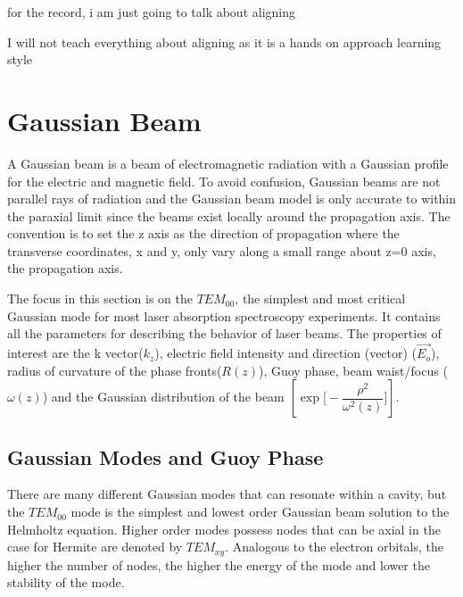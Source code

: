 \documentclass[11pt,a4paper]{book}
\begin{document}
	for the record, i am just going to talk about aligning
	
	I will not teach everything about aligning as it is a hands on approach learning style
	

	\section{Gaussian Beam}
		\label{sec:Gaussian Beam}
		A Gaussian beam is a beam of electromagnetic radiation with a Gaussian profile for the electric and magnetic field. 
		To avoid confusion, Gaussian beams are not parallel rays of radiation and the Gaussian beam model is only accurate to within the paraxial limit since the beams exist locally around the propagation axis.
		The convention is to set the z axis as the direction of propagation where the transverse coordinates, x and y, only vary along a small range about z=0 axis, the propagation axis.
		
		The focus in this section is on the $TEM_{00}$, the simplest and most critical Gaussian mode for most laser absorption spectroscopy experiments. It contains all the parameters for describing the behavior of laser beams. The properties of interest are the k vector($k_z$), electric field intensity and direction (vector) ($\vec{E_o}$), radius of curvature of the phase fronts($R(z)$), Guoy phase, beam waist/focus ($\omega(z)$) and the Gaussian distribution of the beam $\left[ \exp{\bigg[-\dfrac{\rho^2}{\omega^2(z)}\bigg]}\right]$.
		\subsection{Gaussian Modes and Guoy Phase}
			\label{subsec:Gaussian Modes and Guoy Phase}
			
			
			There are many different Gaussian modes that can resonate within a cavity, but the $TEM_{00}$ mode is the simplest and lowest order Gaussian beam solution to the Helmholtz equation. 
			Higher order modes possess nodes that can be axial in the case for Hermite are denoted by $TEM_{xy}$. Analogous to the electron orbitals, the higher the number of nodes, the higher the energy of the mode and lower the stability of the mode.
			
\end{document}
